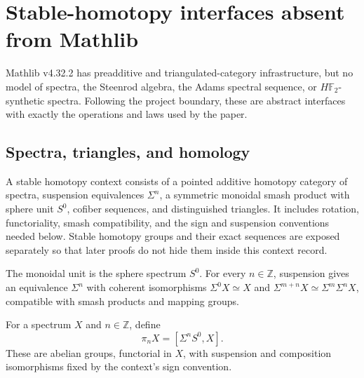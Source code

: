 \chapter{Stable-homotopy interfaces absent from Mathlib}
\label{chap:stable-background}

Mathlib v4.32.2 has preadditive and triangulated-category infrastructure, but
no model of spectra, the Steenrod algebra, the Adams spectral sequence, or
$H\mathbb F_2$-synthetic spectra.  Following the project boundary, these are
abstract interfaces with exactly the operations and laws used by the paper.

\section{Spectra, triangles, and homology}

\begin{definition}
  \label{def:stable-context}
  \notready
  A stable homotopy context consists of a pointed additive homotopy category
  of spectra, suspension equivalences $\Sigma^n$, a symmetric monoidal smash
  product with sphere unit $S^0$, cofiber sequences, and distinguished
  triangles.  It includes rotation, functoriality, smash compatibility, and
  the sign and suspension conventions needed below.  Stable homotopy groups
  and their exact sequences are exposed separately so that later proofs do not
  hide them inside this context record.
\end{definition}

\begin{definition}
  \label{def:stable-sphere-suspension}
  \notready
  The monoidal unit is the sphere spectrum $S^0$.  For every $n\in\mathbb Z$,
  suspension gives an equivalence $\Sigma^n$ with coherent isomorphisms
  $\Sigma^0X\simeq X$ and $\Sigma^{m+n}X\simeq\Sigma^m\Sigma^nX$, compatible
  with smash products and mapping groups.
\end{definition}

\begin{definition}
  \label{def:stable-homotopy-group}
  \notready
  For a spectrum $X$ and $n\in\mathbb Z$, define
  \[
    \pi_nX=[\Sigma^nS^0,X].
  \]
  These are abelian groups, functorial in $X$, with suspension and composition
  isomorphisms fixed by the context's sign convention.
\end{definition}

